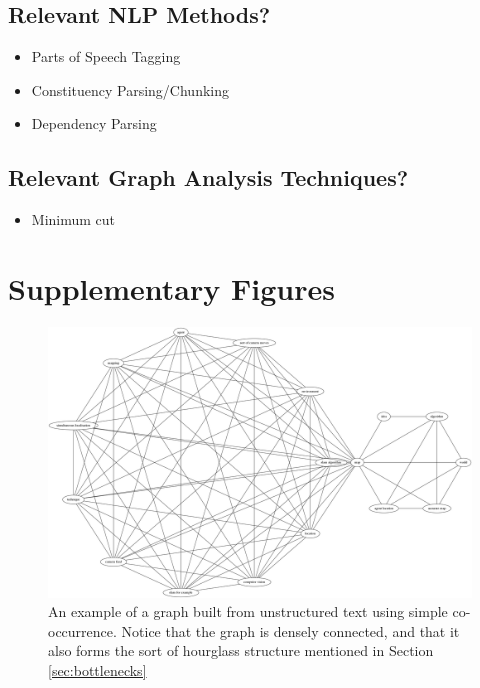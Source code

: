 \documentclass[12pt]{article}
\begin{document}
\subsection{Relevant NLP Methods?}
\begin{itemize}
    \item Parts of Speech Tagging
    \item Constituency Parsing/Chunking
    \item Dependency Parsing
\end{itemize}

\subsection{Relevant Graph Analysis Techniques?}
\begin{itemize}
    \item Minimum cut
\end{itemize}


\section{Supplementary Figures} \label{sec:supplementary figures}

\begin{figure}
    \centering
    \includegraphics[width=\linewidth]{figures/bottleneck.png}
    \caption{An example of a graph built from unstructured text using simple co-occurrence. Notice that the graph is densely connected, and that it also forms the sort of hourglass structure mentioned in Section \ref{sec:bottlenecks}}
    \label{fig:bottleneck example}
\end{figure}
\end{document}
